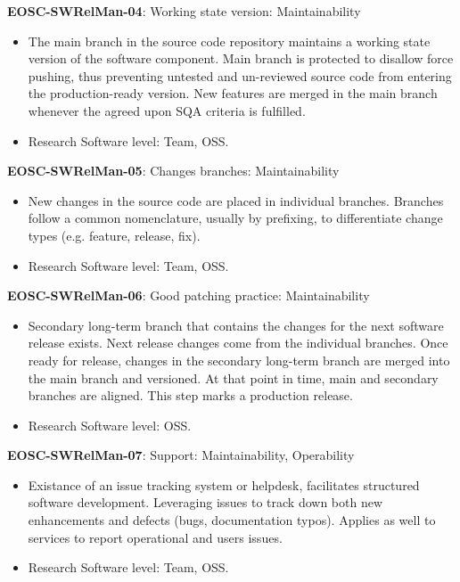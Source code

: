 \textbf{EOSC-SWRelMan-04}: Working state version: Maintainability

\begin{itemize}
    \item The main branch in the source code repository maintains a working state version of the software component. Main branch is protected to disallow force pushing, thus preventing untested and un-reviewed source code from entering the production-ready version. New features are merged in the main branch whenever the agreed upon SQA criteria is fulfilled. \cite{orviz_set_2017}
    \item Research Software level: Team, OSS.
\end{itemize}

\textbf{EOSC-SWRelMan-05}: Changes branches: Maintainability

\begin{itemize}
    \item New changes in the source code are placed in individual branches. Branches follow a common nomenclature, usually by prefixing, to differentiate change types (e.g. feature, release, fix). \cite{orviz_set_2017}
    \item Research Software level: Team, OSS.
\end{itemize}

\textbf{EOSC-SWRelMan-06}: Good patching practice: Maintainability

\begin{itemize}
    \item Secondary long-term branch that contains the changes for the next software release exists. Next release changes come from the individual branches. Once ready for release, changes in the secondary long-term branch are merged into the main branch and versioned. At that point in time, main and secondary branches are aligned. This step marks a production release. \cite{orviz_set_2017,raymond_software_2013}
    \item Research Software level: OSS.
\end{itemize}

\textbf{EOSC-SWRelMan-07}: Support: Maintainability, Operability

\begin{itemize}
    \item Existance of an issue tracking system or helpdesk, facilitates structured software development. Leveraging issues to track down both new enhancements and defects (bugs, documentation typos). Applies as well to services to report operational and users issues. \cite{srisopha_software_2018,shepherdson_cessda_2019,orviz_set_2017,orviz_fernandez_eosc-synergy_2020}
    \item Research Software level: Team, OSS.
\end{itemize}

